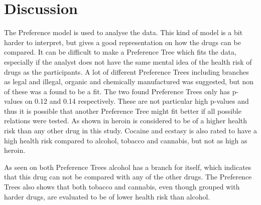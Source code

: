 \section*{Discussion}
\label{Discussion}
%
The Preference model is used to analyse the data. This kind of model is a bit harder to interpret, but gives a good representation on how the drugs can be compared. It can be difficult to make a Preference Tree which fits the data, especially if the analyst does not have the same mental idea of the health risk of drugs as the participants. A lot of different Preference Trees including branches as legal and illegal, organic and chemically manufactured was suggested, but non of these was a found to be a fit. \blankline 
%
The two found Preference Trees only has p-values on 0.12 and 0.14 respectively. These are not particular high p-values and thus it is possible that another Preference Tree might fit better if all possible relations were tested. \blankline 
%
As shown in  heroin is considered to be of a higher health risk than any other drug in this study. Cocaine and ecstasy is also rated to have a high health risk compared to alcohol, tobacco and cannabis, but not as high as heroin.

As seen on both Preference Trees alcohol has a branch for itself, which indicates that this drug can not be compared with any of the other drugs. The Preference Trees also shows that both tobacco and cannabis, even though grouped with harder drugs, are evaluated to be of lower health risk than alcohol.